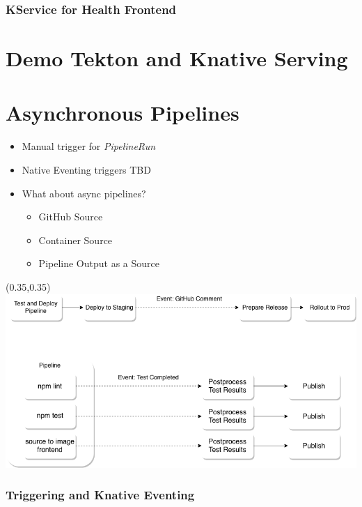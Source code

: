 \documentclass[aspectratio=169,11pt,hyperref={colorlinks=true}]{beamer}
\begin{document}
\begin{lblackrwhiteframe}
\begin{lblackrwhiteframe}
\begin{blackframe}
\begin{2columnsframe}
  {
  
  }
  {
  
  }
  \frametitle{KService for Health Frontend}
\end{2columnsframe}

\section{Demo Tekton and Knative Serving}

\section{Asynchronous Pipelines}

\begin{2columnsframe}
  {
  \begin{itemize}
    \item Manual trigger for {\em PipelineRun}
    \item Native Eventing triggers TBD
    \item What about async pipelines?
    \begin{itemize}
      \item GitHub Source
      \item Container Source
      \item Pipeline Output as a Source
    \end{itemize}
  \end{itemize}
  }
  {
  \begin{textblock*}{0.6\paperwidth}(0.35\paperwidth,0.35\paperheight)
    \centering
    \includegraphics[width=0.6\paperwidth]{img/async_pipelines.png}
  \end{textblock*}
  }
  \frametitle{Triggering and Knative Eventing}
\end{2columnsframe}


\end{blackframe}
\end{lblackrwhiteframe}
\end{lblackrwhiteframe}
\end{document}
